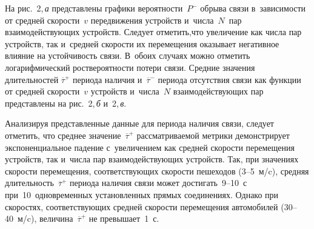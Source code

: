 \begin{multicols}{2}
На рис.~2,\,\textit{а} представлены графики ве\-ро\-ят\-ности~$P^-$ обрыва связи 
в~зависимости от средней скорости~$v$ передвижения устройств 
и~числа~$N$~пар взаимодействующих устройств. Следует отметить,\linebreak что 
увеличение как числа пар устройств, так и~средней скорости их перемещения 
оказывает не\-гативное влияние на устойчивость связи. В~обоих слу\-чаях можно 
отметить логарифмический рост\linebreak ве\-ро\-ят\-ности потери связи. Средние значения 
длительностей $\overline{\tau}^+$ периода наличия и~$\overline{\tau}^-$ 
периода отсутствия связи как функции от средней скорости~$v$ устройств 
и~числа~$N$ взаимодействующих пар представлены на рис.~2,\,\textit{б} и~2,\,\textit{в}. 


  
  
  Анализируя представленные данные для периода наличия связи, следует 
отметить, что среднее значение~$\overline{\tau}^+$ рассматриваемой метрики 
демонстрирует экспоненциальное падение с~увеличением как средней скорости 
перемещения устройств, так и~чис\-ла пар взаимодействующих устройств. Так, 
при значениях скорости перемещения, со\-от\-вет\-ст\-ву\-ющих ско\-рости пешеходов 
(3--5~м/c), средняя длительность~$\overline{\tau}^+$ периода наличия связи 
может достигать~9--10~с при~10~одновременных уста\-нов\-лен\-ных прямых 
соединениях. Однако при скоростях, соответствующих средней ско\-рости 
перемещения автомобилей (30--40~м/c), величина~$\overline{\tau}^+$ не 
превышает~1~с. 



\pagebreak

\end{multicols}

\begin{figure*} %
\vspace*{1pt}
 \begin{center}
 \mbox{%
 \epsfxsize=163.477mm 
 }
\end{center}
\vspace*{-11pt}
\vspace*{12pt}
\end{figure*}

